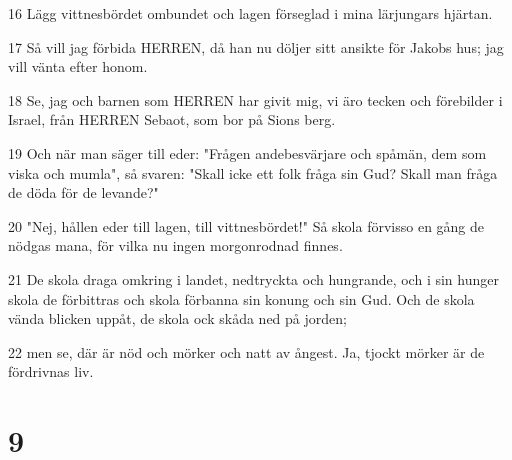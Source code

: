 \par 16 Lägg vittnesbördet ombundet och lagen förseglad i mina lärjungars hjärtan.
\par 17 Så vill jag förbida HERREN, då han nu döljer sitt ansikte för Jakobs hus; jag vill vänta efter honom.
\par 18 Se, jag och barnen som HERREN har givit mig, vi äro tecken och förebilder i Israel, från HERREN Sebaot, som bor på Sions berg.
\par 19 Och när man säger till eder: "Frågen andebesvärjare och spåmän, dem som viska och mumla", så svaren: "Skall icke ett folk fråga sin Gud? Skall man fråga de döda för de levande?"
\par 20 "Nej, hållen eder till lagen, till vittnesbördet!" Så skola förvisso en gång de nödgas mana, för vilka nu ingen morgonrodnad finnes.
\par 21 De skola draga omkring i landet, nedtryckta och hungrande, och i sin hunger skola de förbittras och skola förbanna sin konung och sin Gud. Och de skola vända blicken uppåt, de skola ock skåda ned på jorden;
\par 22 men se, där är nöd och mörker och natt av ångest. Ja, tjockt mörker är de fördrivnas liv.

\chapter{9}

